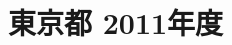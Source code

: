 \documentclass[../../hsm_tok_q.tex]{subfiles}
\begin{document}
    \section{東京都 2011年度}
    \subsection{　}
    
    \newpage
    \subsection{　}
    
    \newpage
    \subsection{　}
    
    \newpage
    \subsection{　}
    
    \newpage
    \subsection{　}
    
\end{document}
